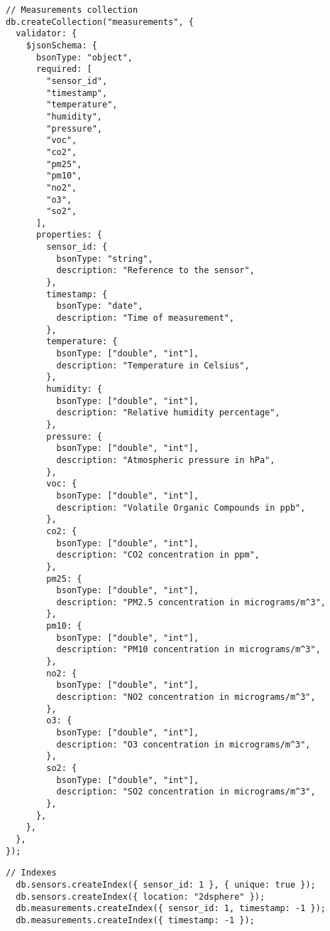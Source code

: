 \begin{lstlisting}[caption={Generazione collezione \texttt{measurements} MongoDB}, label=lst:mongodb-measurements]
// Measurements collection
db.createCollection("measurements", {
  validator: {
    $jsonSchema: {
      bsonType: "object",
      required: [
        "sensor_id",
        "timestamp",
        "temperature",
        "humidity",
        "pressure",
        "voc",
        "co2",
        "pm25",
        "pm10",
        "no2",
        "o3",
        "so2",
      ],
      properties: {
        sensor_id: {
          bsonType: "string",
          description: "Reference to the sensor",
        },
        timestamp: {
          bsonType: "date",
          description: "Time of measurement",
        },
        temperature: {
          bsonType: ["double", "int"],
          description: "Temperature in Celsius",
        },
        humidity: {
          bsonType: ["double", "int"],
          description: "Relative humidity percentage",
        },
        pressure: {
          bsonType: ["double", "int"],
          description: "Atmospheric pressure in hPa",
        },
        voc: {
          bsonType: ["double", "int"],
          description: "Volatile Organic Compounds in ppb",
        },
        co2: {
          bsonType: ["double", "int"],
          description: "CO2 concentration in ppm",
        },
        pm25: {
          bsonType: ["double", "int"],
          description: "PM2.5 concentration in micrograms/m^3",
        },
        pm10: {
          bsonType: ["double", "int"],
          description: "PM10 concentration in micrograms/m^3",
        },
        no2: {
          bsonType: ["double", "int"],
          description: "NO2 concentration in micrograms/m^3",
        },
        o3: {
          bsonType: ["double", "int"],
          description: "O3 concentration in micrograms/m^3",
        },
        so2: {
          bsonType: ["double", "int"],
          description: "SO2 concentration in micrograms/m^3",
        },
      },
    },
  },
});
\end{lstlisting}

\begin{lstlisting}[caption={Generazione indici MongoDB}, label=lst:mongodb-indexes]
  // Indexes
  db.sensors.createIndex({ sensor_id: 1 }, { unique: true });
  db.sensors.createIndex({ location: "2dsphere" });
  db.measurements.createIndex({ sensor_id: 1, timestamp: -1 });
  db.measurements.createIndex({ timestamp: -1 });
\end{lstlisting}